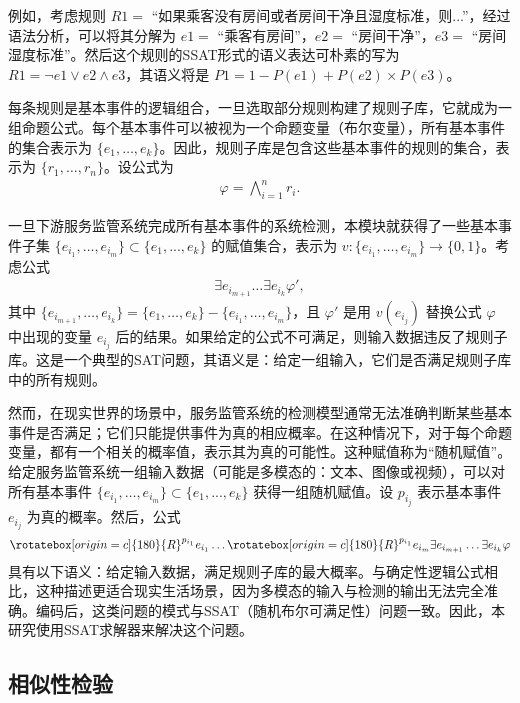 例如，考虑规则 $R1=$ “如果乘客没有房间或者房间干净且湿度标准，则...”，经过语法分析，可以将其分解为 $e1=$ “乘客有房间”，$e2=$ “房间干净”，$e3=$ “房间湿度标准”。然后这个规则的SSAT形式的语义表达可朴素的写为 $R1=\neg e1 \vee e2 \wedge e3$，其语义将是 $P1=1-P(e1)+P(e2)\times P(e3)$。

每条规则是基本事件的逻辑组合，一旦选取部分规则构建了规则子库，它就成为一组命题公式。每个基本事件可以被视为一个命题变量（布尔变量），所有基本事件的集合表示为 $\{e_1, \dots, e_k\}$。因此，规则子库是包含这些基本事件的规则的集合，表示为 $\{r_1, \dots, r_n\}$。设公式为
\begin{align*}
\varphi = \bigwedge_{i=1}^{n} r_i.
\end{align*}

一旦下游服务监管系统完成所有基本事件的系统检测，本模块就获得了一些基本事件子集 $\{e_{i_1}, \dots, e_{i_m}\} \subset \{e_1, ..., e_k\}$ 的赋值集合，表示为 $v: \{e_{i_1}, \dots, e_{i_m}\} \to \{0,1\}$。考虑公式
\begin{align*}
\exists e_{i_{m+1}} \dots \exists e_{i_{k}} \varphi',
\end{align*}
其中 $\{e_{i_{m+1}},\dots,e_{i_{k}}\}=\{e_1,\dots,e_k\} - \{e_{i_1}, \dots, e_{i_m}\}$，且 $\varphi'$ 是用 $v(e_{i_j})$ 替换公式 $\varphi$ 中出现的变量 $e_{i_j}$ 后的结果。如果给定的公式不可满足，则输入数据违反了规则子库。这是一个典型的SAT问题，其语义是：给定一组输入，它们是否满足规则子库中的所有规则。

然而，在现实世界的场景中，服务监管系统的检测模型通常无法准确判断某些基本事件是否满足；它们只能提供事件为真的相应概率。在这种情况下，对于每个命题变量，都有一个相关的概率值，表示其为真的可能性。这种赋值称为“随机赋值”。给定服务监管系统一组输入数据（可能是多模态的：文本、图像或视频），可以对所有基本事件 $\{e_{i_1}, \dots, e_{i_m}\} \subset \{e_1, ..., e_k\}$ 获得一组随机赋值。设 $p_{i_j}$ 表示基本事件 $e_{i_j}$ 为真的概率。然后，公式
\begin{align*}
    \rotatebox[origin=c]{180}{R}^{p_{i_1}} e_{i_1} \dots \rotatebox[origin=c]{180}{R}^{p_{i_1}} e_{i_m}
    \exists e_{i_{m+1}} \dots \exists e_{i_k}
    \varphi
\end{align*}
具有以下语义：给定输入数据，满足规则子库的最大概率。与确定性逻辑公式相比，这种描述更适合现实生活场景，因为多模态的输入与检测的输出无法完全准确。编码后，这类问题的模式与SSAT（随机布尔可满足性）问题一致。因此，本研究使用SSAT求解器来解决这个问题。

\subsection{相似性检验}

